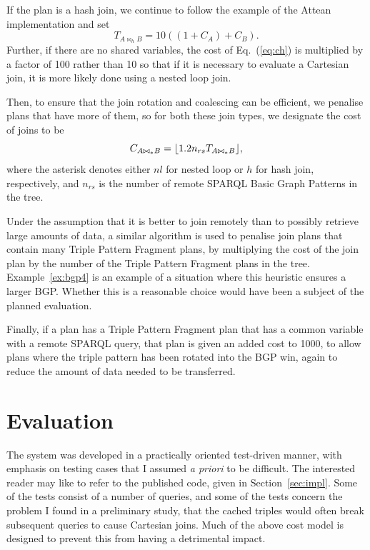 If the plan is a hash join, we continue to follow the example of
the Attean implementation and set
\begin{equation}\label{eq:ch}
T_{A \bowtie_{h} B} = 10 ((1 + C_A) + C_B ) .
\end{equation}
Further, if there are no shared variables, the cost of
Eq.~(\ref{eq:ch}) is multiplied by a factor of 100 rather than 10 so
that if it is necessary to evaluate a Cartesian join, it is more
likely done using a nested loop join.

Then, to ensure that the join rotation and coalescing can be
efficient, we penalise plans that have more of them, so
for both these join types, we designate the cost of joins to be
\begin{equation}\label{eq:cjoins}
C_{A \bowtie_* B} = \lfloor  1.2 n_{rs} T_{A \bowtie_{*} B}  \rfloor ,
\end{equation}
where the asterisk denotes either $nl$ for nested loop or $h$ for hash
join, respectively, and $n_{rs}$ is the number of remote SPARQL Basic
Graph Patterns in the tree.

Under the assumption that it is better to join remotely than to
possibly retrieve large amounts of data, a similar algorithm is used
to penalise join plans that contain many Triple Pattern Fragment
plans, by multiplying the cost of the join plan by the number of the
Triple Pattern Fragment plans in the tree. Example~\ref{ex:bgp4} is an
example of a situation where this heuristic ensures a larger
BGP. Whether this is a reasonable choice would have been a subject of
the planned evaluation.

Finally, if a plan has a Triple Pattern Fragment plan that has a
common variable with a remote SPARQL query, that plan is given an
added cost to 1000, to allow plans where the triple pattern has been
rotated into the BGP win, again to reduce the amount of data needed to
be transferred.

\section{Evaluation}

The system was developed in a practically oriented test-driven manner,
with emphasis on testing cases that I assumed \textit{a priori} to be
difficult. The interested reader may like to refer to the published code,
given in Section~\ref{sec:impl}. Some of the tests consist of a number
of queries, and some of the tests concern the problem I found in a
preliminary study, that the cached triples would often break
subsequent queries to cause Cartesian joins. Much of the above cost
model is designed to prevent this from having a detrimental impact.

